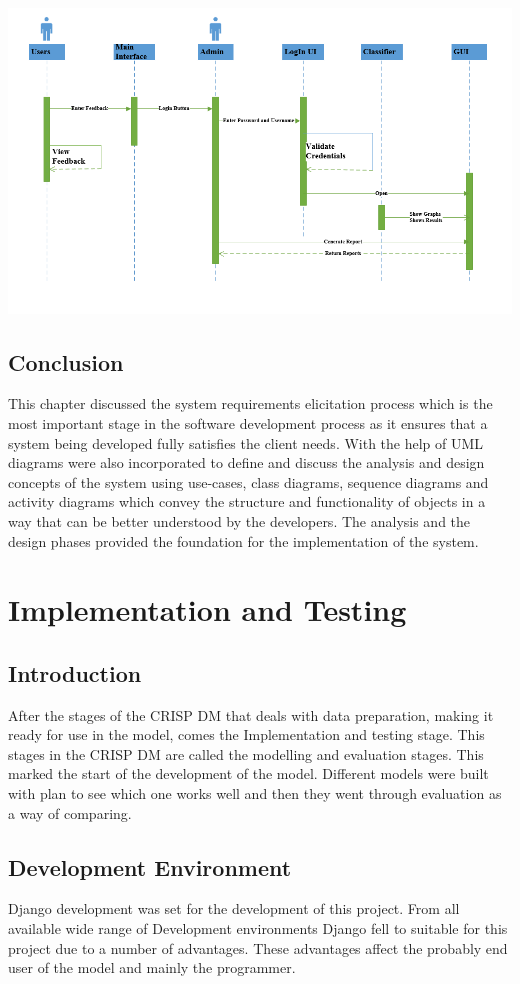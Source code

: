 \documentclass[12pt]{report}
\begin{document}
\includegraphics[scale=0.5]{sq.PNG}
	
	\section{Conclusion}
	
	This chapter discussed the system requirements elicitation process which is the most important stage in the software development process as it ensures that a system being developed fully satisfies the client needs. With the help of UML diagrams were also incorporated to define and discuss the analysis and design concepts of the system using use-cases, class diagrams, sequence diagrams and activity diagrams which convey the structure and functionality of objects in a way that can be better understood by the developers. The analysis and the design phases provided the foundation for the implementation of the system.\\
	
	\chapter{Implementation and Testing}
	\section{Introduction}
	After the stages of the CRISP DM that deals with data preparation, making it ready for use in the model, comes the Implementation and testing stage. This stages in the CRISP DM are called the modelling and evaluation stages. This marked the start of the development of the model. Different models were built with plan to see which one works well and then they went through evaluation as a way of comparing. 
	\section{Development Environment}
	Django development was set for the development of this project. From all available wide range of Development environments Django fell to suitable for this project due to a number of advantages. These advantages affect the probably end user of the model and mainly the programmer.\\
	
\end{document}
